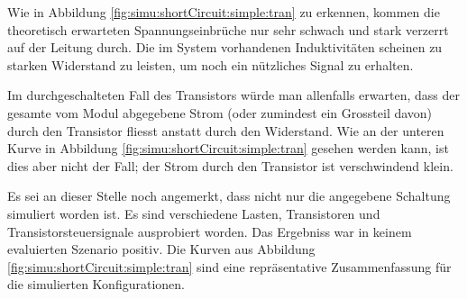 Wie in  Abbildung \ref{fig:simu:shortCircuit:simple:tran} zu  erkennen, kommen
die  theoretisch erwarteten  Spannungseinbr\"uche nur  sehr schwach  und stark
verzerrt  auf der  Leitung durch. Die  im System  vorhandenen Induktivit\"aten
scheinen zu starken Widerstand zu leisten,  um noch ein n\"utzliches Signal zu
erhalten.

Im  durchgeschalteten Fall  des Transistors  w\"urde man  allenfalls erwarten,
dass  der gesamte  vom Modul  abgegebene Strom  (oder zumindest  ein Grossteil
davon) durch den  Transistor fliesst anstatt durch den  Widerstand. Wie an der
unteren  Kurve  in Abbildung  \ref{fig:simu:shortCircuit:simple:tran}  gesehen
werden kann, ist dies aber nicht der  Fall; der Strom durch den Transistor ist
verschwindend klein.

Es   sei   an   dieser   Stelle   noch   angemerkt,   dass   nicht   nur   die
angegebene    Schaltung   simuliert    worden   ist. Es    sind   verschiedene
Lasten,  Transistoren  und   Transistorsteuersignale  ausprobiert  worden. Das
Ergebniss  war   in  keinem  evaluierten  Szenario   positiv. Die  Kurven  aus
Abbildung  \ref{fig:simu:shortCircuit:simple:tran} sind  eine repr\"asentative
Zusammenfassung f\"ur die simulierten Konfigurationen.


